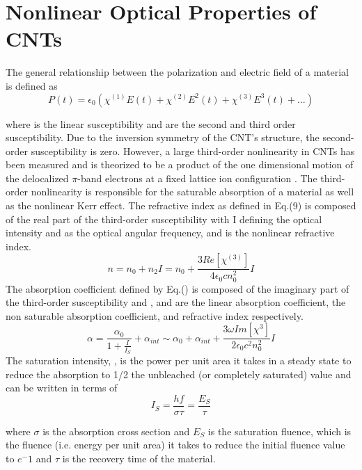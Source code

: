\section{Nonlinear Optical Properties of CNTs}
The general relationship between the polarization and electric field of a material is defined \cite{yamashita.tutorial} as
\begin{equation}
	P(t) = \epsilon_0(\chi^{(1)}E(t) + \chi^{(2)}E^2(t) + \chi^{(3)}E^3(t)+...)
\end{equation}

where is the linear susceptibility and are the second and third order susceptibility. Due to the inversion symmetry of the CNT’s structure, the second-order susceptibility is zero. However, a large third-order nonlinearity in CNTs has been measured \cite{martinez} and is theorized to be a product of the one dimensional motion of the delocalized $\pi$-band electrons at a fixed lattice ion configuration \cite{margulis}.  The third-order nonlinearity is responsible for the saturable absorption of a material as well as the nonlinear Kerr effect.
The refractive index as defined in Eq.(9) is composed of the real part of the third-order susceptibility with I defining the optical intensity and  as the optical angular frequency, and  is the nonlinear refractive index.
\begin{equation}
	n = n_0 + n_2I = n_0 + \frac{3Re[\chi^{(3)}]}{4\epsilon_0cn_0^2}I
\end{equation}
The absorption coefficient defined by Eq.() is composed of the imaginary part of the third-order susceptibility and  ,  and  are the linear absorption coefficient, the non saturable absorption coefficient, and refractive index respectively.
\begin{equation}
	\alpha = \frac{\alpha_0}{1+\frac{I}{I_S}} + \alpha_{int} \sim\alpha_0 + \alpha_{int} + \frac{3\omega Im[\chi^{3}]}{2\epsilon_0c^2n_0^2}I
\end{equation}
The saturation intensity, , is the power per unit area it takes in a steady state to reduce the absorption to 1/2 the unbleached (or completely saturated) value and can be written in terms of
\begin{equation}
	I_S = \frac{hf}{\sigma\tau} =\frac{E_S}{\tau}
\end{equation}

where  $\sigma$ is the absorption cross section and $E_S$ is the saturation fluence, which is the fluence (i.e. energy per unit area) it takes to reduce the initial fluence value to $e^-1$ and  $\tau$ is the recovery time of the material.

